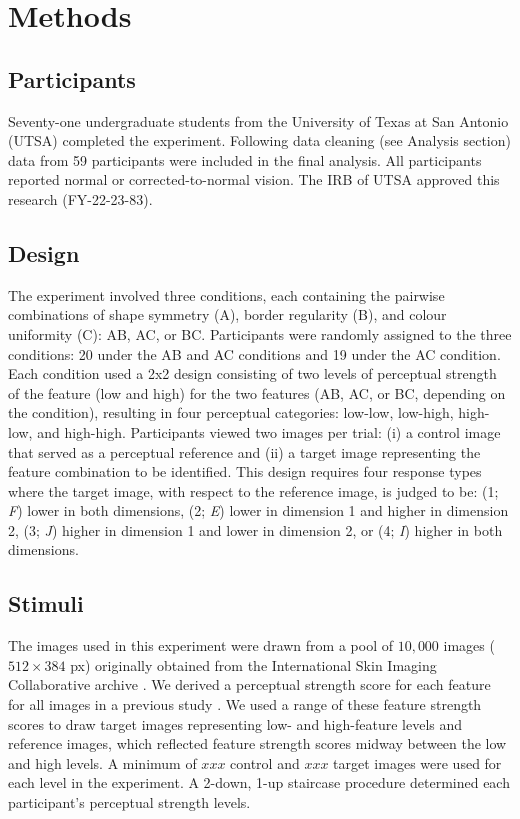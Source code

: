 \documentclass[man, 12pt, a4paper,  donotrepeattitle, floatsintext, draftfirst]{apa7}
\begin{document}
\section{Methods}
\subsection{Participants}
Seventy-one undergraduate students from the University of Texas at San Antonio (UTSA) completed the experiment.
Following data cleaning (see Analysis section) data from 59 participants were included in the final analysis.
All participants reported normal or corrected-to-normal vision.
The IRB of UTSA approved this research (FY-22-23-83).

\subsection{Design}
The experiment involved three conditions, each containing the pairwise combinations of shape symmetry (A), border regularity (B), and colour uniformity (C):
AB, AC, or BC.
Participants were randomly assigned to the three conditions:
20 under the AB and AC conditions and
19 under the AC condition.
Each condition used a 2x2 design consisting of two levels of perceptual strength of the feature (low and high) for the two features (AB, AC, or BC, depending on the condition), resulting in four perceptual categories:
low-low, low-high, high-low, and high-high.
Participants viewed two images per trial:
(i) a control image that served as a perceptual reference and
(ii) a target image representing the feature combination to be identified.
This design requires four response types where the target image, with respect to the reference image, is judged to be:
(1; \textit{F}) lower in both dimensions,
(2; \textit{E}) lower in dimension 1 and higher in dimension 2,
(3; \textit{J}) higher in dimension 1 and lower in dimension 2, or
(4; \textit{I}) higher in both dimensions.

\subsection{Stimuli}
The images used in this experiment were drawn from a pool of $10, 000$ images ($512\times384$ px) originally obtained from the International Skin Imaging Collaborative archive \parencite{ISICref}.
We derived a perceptual strength score for each feature for all images in a previous study \parencite[see][]{bennett2024features}.
We used a range of these feature strength scores to draw target images representing low- and high-feature levels and reference images, which reflected feature strength scores midway between the low and high levels.
A minimum of $xxx$ control and $xxx$ target images were used for each level in the experiment.
A 2-down, 1-up staircase procedure determined each participant's perceptual strength levels. 
\end{document}
